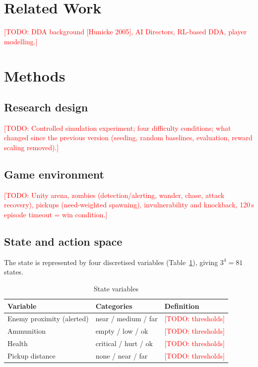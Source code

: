 \documentclass[10pt,a4paper]{article}
\newcommand{\todo}[1]{\textcolor{red}{[TODO: #1]}}
\begin{document}
\section{Related Work}
\todo{DDA background [Hunicke 2005], AI Directors, RL-based DDA, player modelling.}

\section{Methods}

\subsection{Research design}
\todo{Controlled simulation experiment; four difficulty conditions; what changed since the
previous version (seeding, random baselines, evaluation, reward scaling removed).}

\subsection{Game environment}
\todo{Unity arena, zombies (detection/alerting, wander, chase, attack recovery),
pickups (need-weighted spawning), invulnerability and knockback, 120\,s episode timeout
= win condition.}

\subsection{State and action space}
The state is represented by four discretised variables
(Table~\ref{tab:state}), giving $3^4 = 81$ states.

\begin{table}[h]
\centering
\caption{State variables}
\label{tab:state}
\begin{tabular}{lll}
\toprule
Variable & Categories & Definition \\
\midrule
Enemy proximity (alerted) & near / medium / far & \todo{thresholds} \\
Ammunition & empty / low / ok & \todo{thresholds} \\
Health & critical / hurt / ok & \todo{thresholds} \\
Pickup distance & none / near / far & \todo{thresholds} \\
\bottomrule
\end{tabular}
\end{table}
\end{document}
